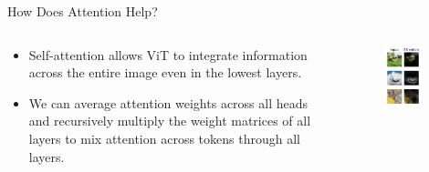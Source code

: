 \begin{frame}{How Does Attention Help?}
    \begin{columns}
        \begin{column}{0.65\textwidth}
            \begin{itemize}
                \item Self-attention allows ViT to integrate information across the entire image even in the lowest layers.
                \item We can average attention weights across all heads and recursively multiply the weight matrices of all layers to mix attention across tokens through all layers.
            \end{itemize}
        \end{column}
        \begin{column}{0.35\textwidth}
            \begin{figure}
                \centering
                \includegraphics[width=0.8\textwidth]{pic/20201002_selected_attention_examples}
                \label{fig:inspecting-vit}
            \end{figure}
        \end{column}
    \end{columns}
\end{frame}

